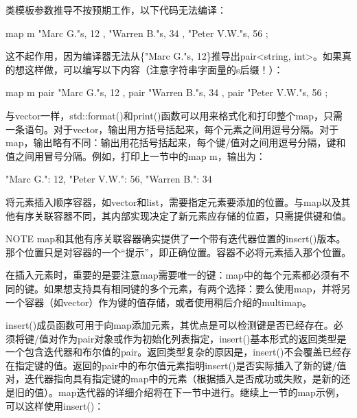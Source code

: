 类模板参数推导不按预期工作，以下代码无法编译：

\begin{cpp}
map m {
    { "Marc G."s, 12 }, { "Warren B."s, 34 }, { "Peter V.W."s, 56 }
};
\end{cpp}

这不起作用，因为编译器无法从\{"Marc G."s, 12\}推导出pair<string, int>。如果真的想这样做，可以编写以下内容（注意字符串字面量的s后缀！）：

\begin{cpp}
map m {
    pair { "Marc G."s, 12 }, pair { "Warren B."s, 34 }, pair { "Peter V.W."s, 56 }
};
\end{cpp}



与vector一样，std::format()和print()函数可以用来格式化和打印整个map，只需一条语句。对于vector，输出用方括号括起来，每个元素之间用逗号分隔。对于map，输出略有不同：输出用花括号括起来，每个键/值对之间用逗号分隔，键和值之间用冒号分隔。例如，打印上一节中的map m，输出为：

\begin{cpp}
{"Marc G.": 12, "Peter V.W.": 56, "Warren B.": 34}
\end{cpp}


将元素插入顺序容器，如vector和list，需要指定元素要添加的位置。与map以及其他有序关联容器不同，其内部实现决定了新元素应存储的位置，只需提供键和值。

\begin{myNotic}{NOTE}
map和其他有序关联容器确实提供了一个带有迭代器位置的insert()版本。那个位置只是对容器的一个“提示”，即正确位置。容器不必将元素插入那个位置。
\end{myNotic}

在插入元素时，重要的是要注意map需要唯一的键：map中的每个元素都必须有不同的键。如果想支持具有相同键的多个元素，有两个选择：要么使用map，并将另一个容器（如vector）作为键的值存储，或者使用稍后介绍的multimap。


insert()成员函数可用于向map添加元素，其优点是可以检测键是否已经存在。必须将键/值对作为pair对象或作为初始化列表指定，insert()基本形式的返回类型是一个包含迭代器和布尔值的pair。返回类型复杂的原因是，insert()不会覆盖已经存在指定键的值。返回的pair中的布尔值元素指明insert()是否实际插入了新的键/值对，迭代器指向具有指定键的map中的元素（根据插入是否成功或失败，是新的还是旧的值）。map迭代器的详细介绍将在下一节中进行。继续上一节的map示例，可以这样使用insert()：

